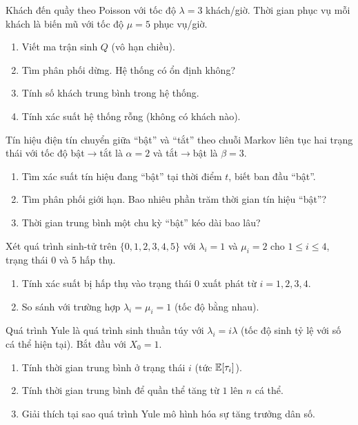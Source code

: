 \begin{exercise}
Khách đến quầy theo Poisson với tốc độ $\lambda = 3$ khách/giờ.
Thời gian phục vụ mỗi khách là biến mũ với tốc độ $\mu = 5$ phục vụ/giờ.
\begin{enumerate}[nosep]
  \item Viết ma trận sinh $Q$ (vô hạn chiều).
  \item Tìm phân phối dừng. Hệ thống có ổn định không?
  \item Tính số khách trung bình trong hệ thống.
  \item Tính xác suất hệ thống rỗng (không có khách nào).
\end{enumerate}
\end{exercise}

\begin{exercise}
Tín hiệu điện tín chuyển giữa ``bật'' và ``tắt'' theo chuỗi Markov liên tục hai trạng thái
với tốc độ bật$\to$tắt là $\alpha = 2$ và tắt$\to$bật là $\beta = 3$.
\begin{enumerate}[nosep]
  \item Tìm xác suất tín hiệu đang ``bật'' tại thời điểm $t$, biết ban đầu ``bật''.
  \item Tìm phân phối giới hạn. Bao nhiêu phần trăm thời gian tín hiệu ``bật''?
  \item Thời gian trung bình một chu kỳ ``bật'' kéo dài bao lâu?
\end{enumerate}
\end{exercise}

\begin{exercise}
Xét quá trình sinh-tử trên $\{0, 1, 2, 3, 4, 5\}$ với $\lambda_i = 1$ và $\mu_i = 2$ cho $1 \leq i \leq 4$,
trạng thái $0$ và $5$ hấp thụ.
\begin{enumerate}[nosep]
  \item Tính xác suất bị hấp thụ vào trạng thái $0$ xuất phát từ $i = 1, 2, 3, 4$.
  \item So sánh với trường hợp $\lambda_i = \mu_i = 1$ (tốc độ bằng nhau).
\end{enumerate}
\end{exercise}

\begin{exercise}
Quá trình Yule là quá trình sinh thuần túy với $\lambda_i = i\lambda$ (tốc độ sinh tỷ lệ với số cá thể hiện tại).
Bắt đầu với $X_0 = 1$.
\begin{enumerate}[nosep]
  \item Tính thời gian trung bình ở trạng thái $i$ (tức $\mathbb{E}[\tau_i]$).
  \item Tính thời gian trung bình để quần thể tăng từ $1$ lên $n$ cá thể.
  \item Giải thích tại sao quá trình Yule mô hình hóa sự tăng trưởng dân số.
\end{enumerate}
\end{exercise}

